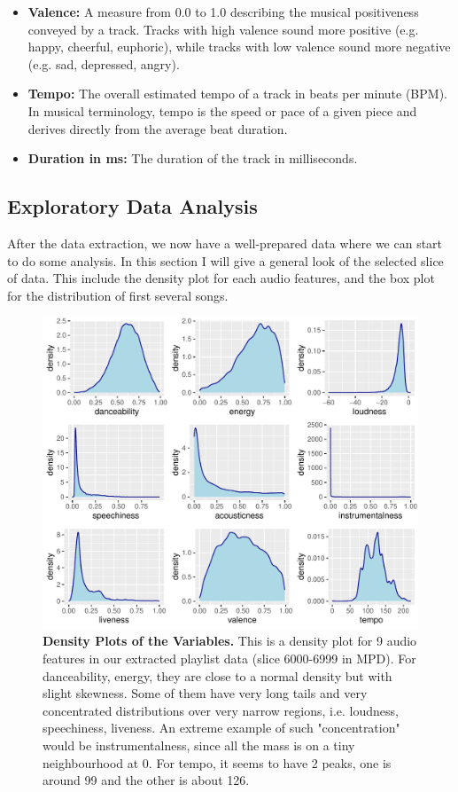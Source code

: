 \documentclass[12pt]{article}
\theoremstyle{plain}
\theoremstyle{definition}
\theoremstyle{remark}
\begin{document}
\begin{itemize}
    \item \textbf{Valence:} A measure from 0.0 to 1.0 describing the musical positiveness conveyed by a track. Tracks with high valence sound more positive (e.g. happy, cheerful, euphoric), while tracks with low valence sound more negative (e.g. sad, depressed, angry).
    \item \textbf{Tempo:} The overall estimated tempo of a track in beats per minute (BPM). In musical terminology, tempo is the speed or pace of a given piece and derives directly from the average beat duration.
    \item \textbf{Duration in ms:} The duration of the track in milliseconds.
\end{itemize}

\newpage
\subsection{Exploratory Data Analysis}
After the data extraction, we now have a well-prepared data where we can start to do some analysis. In this section I will give a general look of the selected slice of data. This include the density plot for each audio features, and the box plot for the distribution of first several songs. 

\begin{figure}[htp]
    \centering
    \includegraphics[width=\textwidth]{Images/density.pdf}
    \caption{\textbf{Density Plots of the Variables.} This is a density plot for 9 audio features in our extracted playlist data (slice 6000-6999 in MPD). For danceability, energy, they are close to a normal density but with slight skewness. Some of them have very long tails and very concentrated distributions over very narrow regions, i.e. loudness, speechiness, liveness. An extreme example of such "concentration" would be instrumentalness, since all the mass is on a tiny neighbourhood at 0. For tempo, it seems to have 2 peaks, one is around 99 and the other is about 126.}
    \label{fig:Density}
\end{figure}
\end{document}
